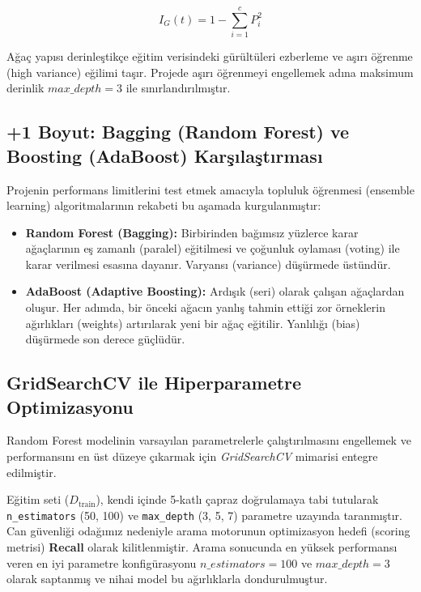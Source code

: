 \documentclass[12pt,a4paper]{article}
\begin{document}
\begin{equation}
    I_G(t) = 1 - \sum_{i=1}^{c} P_i^2
\end{equation}

Ağaç yapısı derinleştikçe eğitim verisindeki gürültüleri ezberleme ve aşırı öğrenme (high variance) eğilimi taşır. Projede aşırı öğrenmeyi engellemek adına maksimum derinlik $max\_depth=3$ ile sınırlandırılmıştır.

\subsection{+1 Boyut: Bagging (Random Forest) ve Boosting (AdaBoost) Karşılaştırması}
Projenin performans limitlerini test etmek amacıyla topluluk öğrenmesi (ensemble learning) algoritmalarının rekabeti bu aşamada kurgulanmıştır:
\begin{itemize}
    \item \textbf{Random Forest (Bagging):} Birbirinden bağımsız yüzlerce karar ağaçlarının eş zamanlı (paralel) eğitilmesi ve çoğunluk oylaması (voting) ile karar verilmesi esasına dayanır. Varyansı (variance) düşürmede üstündür.
    \item \textbf{AdaBoost (Adaptive Boosting):} Ardışık (seri) olarak çalışan ağaçlardan oluşur. Her adımda, bir önceki ağacın yanlış tahmin ettiği zor örneklerin ağırlıkları (weights) artırılarak yeni bir ağaç eğitilir. Yanlılığı (bias) düşürmede son derece güçlüdür.
\end{itemize}

\subsection{GridSearchCV ile Hiperparametre Optimizasyonu}
Random Forest modelinin varsayılan parametrelerle çalıştırılmasını engellemek ve performansını en üst düzeye çıkarmak için \textit{GridSearchCV} mimarisi entegre edilmiştir. 

Eğitim seti ($D_{\text{train}}$), kendi içinde 5-katlı çapraz doğrulamaya tabi tutularak \texttt{n\_estimators} (50, 100) ve \texttt{max\_depth} (3, 5, 7) parametre uzayında taranmıştır. Can güvenliği odağımız nedeniyle arama motorunun optimizasyon hedefi (scoring metrisi) \textbf{Recall} olarak kilitlenmiştir. Arama sonucunda en yüksek performansı veren en iyi parametre konfigürasyonu $n\_estimators=100$ ve $max\_depth=3$ olarak saptanmış ve nihai model bu ağırlıklarla dondurulmuştur.

\newpage

\end{document}
